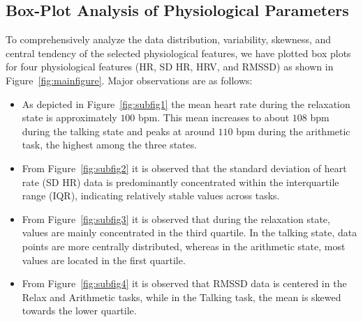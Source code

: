 
\subsection{Box-Plot Analysis of Physiological Parameters}
To comprehensively analyze the data distribution, variability, skewness, and central tendency of the selected physiological features, we have plotted  box plots for four physiological features (HR, SD HR, HRV, and RMSSD)  as shown in Figure~\ref{fig:mainfigure}. Major observations are as follows:
\begin{itemize}

\item As depicted in Figure~\ref{fig:subfig1} the mean heart rate during the relaxation state is approximately $100$ bpm. This mean increases to about $108$ bpm during the talking state and peaks at around $110$ bpm during the arithmetic task, the highest among the three states.

\item From Figure~\ref{fig:subfig2} it is observed  that the standard deviation of heart rate (SD HR) data 
is predominantly concentrated within the interquartile range (IQR), indicating relatively stable values across tasks.

\item From Figure~\ref{fig:subfig3} it is observed  that during the relaxation state, values are mainly concentrated in the third quartile. In the talking state, data points are more centrally distributed, whereas in the arithmetic state, most values are located in the first quartile.

\item From  Figure~\ref{fig:subfig4} it is observed that RMSSD data is centered in the Relax and Arithmetic tasks, while in the Talking task, the mean is skewed towards the lower quartile.

\end{itemize}


